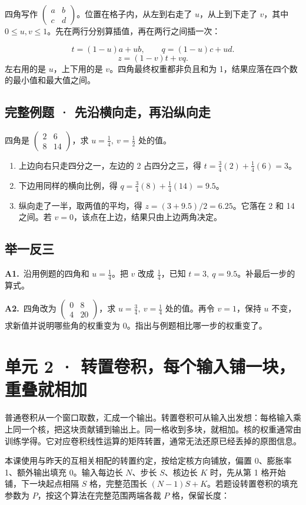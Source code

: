 \documentclass[UTF8,a4paper,11pt]{ctexart}
\newcommand{\CompactQuestion}[2]{\par\noindent\textbf{#1.}\ #2\par\vspace{.8em}}
\begin{document}
四角写作 $\begin{pmatrix}a&b\\c&d\end{pmatrix}$。位置在格子内，从左到右走了 $u$，从上到下走了 $v$，其中 $0\le u,v\le1$。先在两行分别算插值，再在两行之间插一次：

\[t=(1-u)a+ub,\qquad q=(1-u)c+ud.\]
\[z=(1-v)t+vq.\]
左右用的是 $u$，上下用的是 $v$。四角最终权重都非负且和为 1，结果应落在四个数的最小值和最大值之间。

\subsection{完整例题 · 先沿横向走，再沿纵向走}
四角是 $\begin{pmatrix}2&6\\8&14\end{pmatrix}$，求 $u=\frac14,\ v=\frac12$ 处的值。

\begin{enumerate}
\item 上边向右只走四分之一，左边的 2 占四分之三，得 $t=\frac34(2)+\frac14(6)=3$。
\item 下边用同样的横向比例，得 $q=\frac34(8)+\frac14(14)=9.5$。
\item 纵向走了一半，取两值的平均，得 $z=(3+9.5)/2=6.25$。它落在 2 和 14 之间。若 $v=0$，该点在上边，结果只由上边两角决定。
\end{enumerate}
\subsection{举一反三}
\CompactQuestion{A1}{沿用例题的四角和 $u=\frac14$。把 $v$ 改成 $\frac14$，已知 $t=3,\ q=9.5$。补最后一步的算式。}
\CompactQuestion{A2}{四角改为 $\begin{pmatrix}0&8\\4&20\end{pmatrix}$，求 $u=\frac34,\ v=\frac14$ 处的值。再令 $v=1$，保持 $u$ 不变，求新值并说明哪些角的权重变为 0。指出与例题相比哪一步的权重变了。}
\clearpage
\section{单元 2 · 转置卷积，每个输入铺一块，重叠就相加}
普通卷积从一个窗口取数，汇成一个输出。转置卷积可从输入出发想：每格输入乘上同一个核，把这块贡献铺到输出上。同一格收到多块，就相加。核的权重通常由训练学得。它对应卷积线性运算的矩阵转置，通常无法还原已经丢掉的原图信息。

本课使用与昨天的互相关相配的转置约定，按给定核方向铺放，偏置 0、膨胀率 1、额外输出填充 0。输入每边长 $N$、步长 $S$、核边长 $K$ 时，先从第 1 格开始铺，下一块起点相隔 $S$ 格，完整范围长 $(N-1)S+K$。若题设转置卷积的填充参数为 $P$，按这个算法在完整范围两端各裁 $P$ 格，保留长度：
\end{document}
